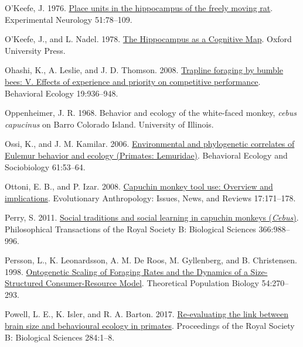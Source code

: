\documentclass[twoside,12pt,final]{ucthesis-CA2012}
\newenvironment{CSLReferences}%
  {}%
  {\par}
\begin{document}
\begin{ucmainmatter}
\begin{CSLReferences}{1}{0}
\leavevmode{}%
O'Keefe, J. 1976. \href{https://doi.org/10.1016/0014-4886(76)90055-8}{Place units in the hippocampus of the freely moving rat}. Experimental Neurology 51:78--109.

\leavevmode{}%
O'Keefe, J., and L. Nadel. 1978. \href{https://doi.org/10.5840/philstudies19802725}{The Hippocampus as a Cognitive Map}. Oxford University Press.

\leavevmode{}%
Ohashi, K., A. Leslie, and J. D. Thomson. 2008. \href{https://doi.org/10.1093/beheco/arn048}{Trapline foraging by bumble bees: V. Effects of experience and priority on competitive performance}. Behavioral Ecology 19:936--948.

\leavevmode{}%
Oppenheimer, J. R. 1968. Behavior and ecology of the white-faced monkey, \emph{cebus capucinus} on Barro Colorado Island. University of Illinois.

\leavevmode{}%
Ossi, K., and J. M. Kamilar. 2006. \href{https://doi.org/10.1007/s00265-006-0236-7}{Environmental and phylogenetic correlates of Eulemur behavior and ecology (Primates: Lemuridae)}. Behavioral Ecology and Sociobiology 61:53--64.

\leavevmode{}%
Ottoni, E. B., and P. Izar. 2008. \href{https://doi.org/10.1002/evan.20185}{Capuchin monkey tool use: Overview and implications}. Evolutionary Anthropology: Issues, News, and Reviews 17:171--178.

\leavevmode{}%
Perry, S. 2011. \href{https://doi.org/10.1098/rstb.2010.0317}{Social traditions and social learning in capuchin monkeys (\emph{Cebus})}. Philosophical Transactions of the Royal Society B: Biological Sciences 366:988--996.

\leavevmode{}%
Persson, L., K. Leonardsson, A. M. De Roos, M. Gyllenberg, and B. Christensen. 1998. \href{https://doi.org/10.1006/tpbi.1998.1380}{Ontogenetic Scaling of Foraging Rates and the Dynamics of a Size-Structured Consumer-Resource Model}. Theoretical Population Biology 54:270--293.

\leavevmode{}%
Powell, L. E., K. Isler, and R. A. Barton. 2017. \href{https://doi.org/10.1098/rspb.2017.1765}{Re-evaluating the link between brain size and behavioural ecology in primates}. Proceedings of the Royal Society B: Biological Sciences 284:1--8.


\end{CSLReferences}
\end{ucmainmatter}
\end{document}
